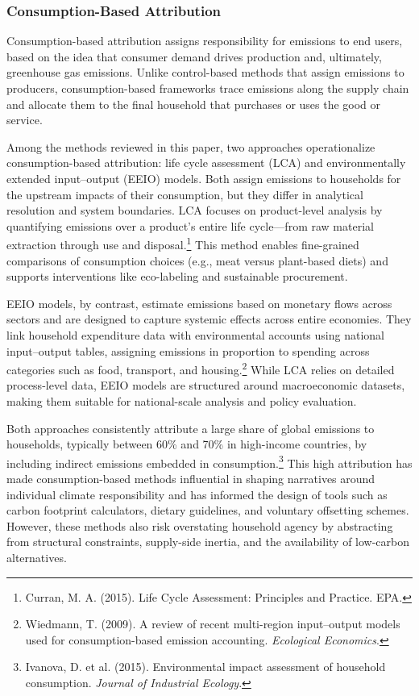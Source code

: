 \documentclass[12pt,a4paper]{article}%
\begin{document}
\subsubsection{Consumption-Based Attribution}

Consumption-based attribution assigns responsibility for emissions to end users, based on the idea that consumer demand drives production and, ultimately, greenhouse gas emissions. Unlike control-based methods that assign emissions to producers, consumption-based frameworks trace emissions along the supply chain and allocate them to the final household that purchases or uses the good or service.

Among the methods reviewed in this paper, two approaches operationalize consumption-based attribution: life cycle assessment (LCA) and environmentally extended input–output (EEIO) models. Both assign emissions to households for the upstream impacts of their consumption, but they differ in analytical resolution and system boundaries. LCA focuses on product-level analysis by quantifying emissions over a product’s entire life cycle—from raw material extraction through use and disposal.\footnote{Curran, M. A. (2015). Life Cycle Assessment: Principles and Practice. EPA.} This method enables fine-grained comparisons of consumption choices (e.g., meat versus plant-based diets) and supports interventions like eco-labeling and sustainable procurement.

EEIO models, by contrast, estimate emissions based on monetary flows across sectors and are designed to capture systemic effects across entire economies. They link household expenditure data with environmental accounts using national input–output tables, assigning emissions in proportion to spending across categories such as food, transport, and housing.\footnote{Wiedmann, T. (2009). A review of recent multi-region input–output models used for consumption-based emission accounting. \textit{Ecological Economics}.} While LCA relies on detailed process-level data, EEIO models are structured around macroeconomic datasets, making them suitable for national-scale analysis and policy evaluation.

Both approaches consistently attribute a large share of global emissions to households, typically between 60\% and 70\% in high-income countries, by including indirect emissions embedded in consumption.\footnote{Ivanova, D. et al. (2015). Environmental impact assessment of household consumption. \textit{Journal of Industrial Ecology}.} This high attribution has made consumption-based methods influential in shaping narratives around individual climate responsibility and has informed the design of tools such as carbon footprint calculators, dietary guidelines, and voluntary offsetting schemes. However, these methods also risk overstating household agency by abstracting from structural constraints, supply-side inertia, and the availability of low-carbon alternatives.
\end{document}
